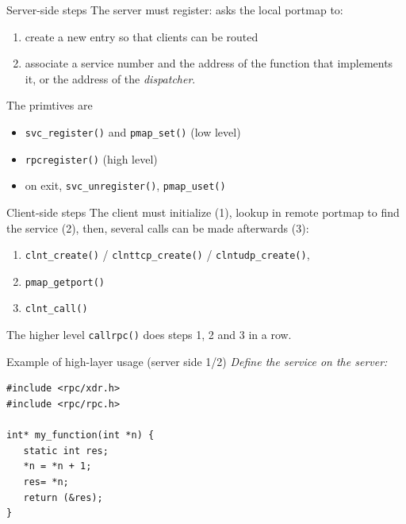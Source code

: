 \documentclass[bigger,hyperref={colorlinks=true, urlcolor=red, plainpages=false, pdfpagelabels, bookmarksnumbered}]{beamer}
\begin{document}
\begin{frame}[fragile,label=sec-2-9]{Server-side steps}
 The server must \alert{register}: asks the local portmap to:
\begin{enumerate}
\item create a new entry so that clients can be routed
\item associate a service number and the address of the function 
that implements it, or the address of the \emph{dispatcher}.
\end{enumerate}
\begin{block}{The primtives are}
\begin{itemize}
\item \texttt{svc\_register()} and \texttt{pmap\_set()} (low level)
\item \texttt{rpcregister()} (high level)
\item on exit, \texttt{svc\_unregister()}, \texttt{pmap\_uset()}
\end{itemize}
\end{block}
\end{frame}
\begin{frame}[fragile,label=sec-2-10]{Client-side steps}
 The client must initialize (1), lookup in remote portmap to find the service (2),
then, several calls can be made afterwards (3):
\begin{enumerate}
\item \texttt{clnt\_create()} / \texttt{clnttcp\_create()} / \texttt{clntudp\_create()},
\item \texttt{pmap\_getport()}
\item \texttt{clnt\_call()}
\end{enumerate}

The higher level \texttt{callrpc()} does steps 1, 2 and 3 in a row.
\end{frame}

\begin{frame}[fragile,label=sec-2-11]{Example of high-layer usage (server side 1/2)}
 \emph{Define the service on the server:}
\lstset{language=C,label= ,caption= ,numbers=none}
\begin{lstlisting}
#include <rpc/xdr.h>
#include <rpc/rpc.h>

int* my_function(int *n) {
   static int res;
   *n = *n + 1;
   res= *n; 
   return (&res);
}
\end{lstlisting}
\end{frame}
\end{document}
